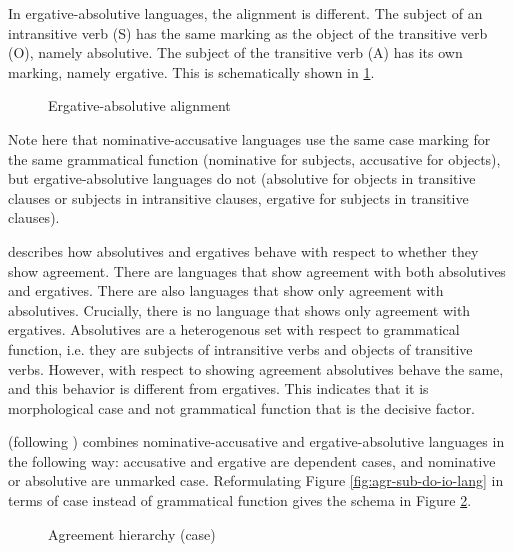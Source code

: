 In ergative-absolutive languages, the alignment is different. The subject of an intransitive verb (S) has the same marking as the object of the transitive verb (O), namely absolutive. The subject of the transitive verb (A) has its own marking, namely ergative. This is schematically shown in \ref{fig:erg-abs-lang}.

\begin{figure}[H]
  \centering
  \caption{Ergative-absolutive alignment}
  \label{fig:erg-abs-lang}
\end{figure}

Note here that nominative-accusative languages use the same case marking for the same grammatical function (nominative for subjects, accusative for objects), but ergative-absolutive languages do not (absolutive for objects in transitive clauses or subjects in intransitive clauses, ergative for subjects in transitive clauses).

\citet{bobaljik2006} describes how absolutives and ergatives behave with respect to whether they show agreement. There are languages that show agreement with both absolutives and ergatives. There are also languages that show only agreement with absolutives. Crucially, there is no language that shows only agreement with ergatives. Absolutives are a heterogenous set with respect to grammatical function, i.e. they are subjects of intransitive verbs and objects of transitive verbs. However, with respect to showing agreement absolutives behave the same, and this behavior is different from ergatives. This indicates that it is morphological case and not grammatical function that is the decisive factor.

\citeauthor{bobaljik2006} (following \citealt{marantz2000}) combines nominative-accusative and ergative-absolutive languages in the following way: accusative and ergative are dependent cases, and nominative or absolutive are unmarked case. Reformulating Figure \ref{fig:agr-sub-do-io-lang} in terms of case instead of grammatical function gives the schema in Figure \ref{fig:agr-def-dep-dat}.

\begin{figure}[H]
  \centering
  \caption{Agreement hierarchy (case)}
  \label{fig:agr-def-dep-dat}
\end{figure}

